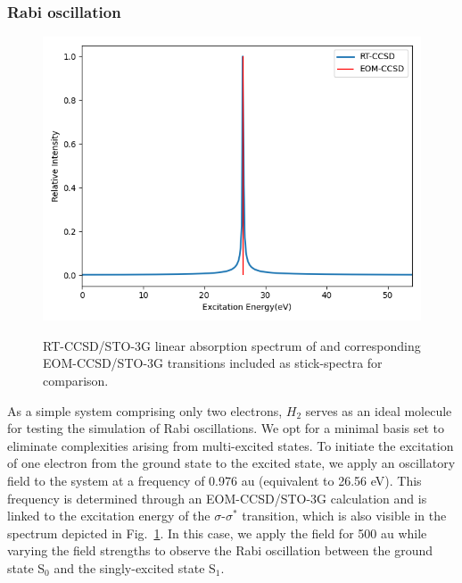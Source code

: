 \subsubsection{Rabi oscillation} \label{results-cc3-31}
 \label{results-cc3-311}
\begin{figure}
   \centering
   \includegraphics[angle=0, scale=0.45]{ch4/Figs/6-1.png}
   \label{fig:sp-monomer}
   \caption{RT-CCSD/STO-3G linear absorption spectrum of  and corresponding EOM-CCSD/STO-3G transitions included as stick-spectra for comparison.}
     \label{fig:h2-abs}
\end{figure}
As a simple system comprising only two electrons, $H_{2}$ serves as an ideal molecule for testing the simulation of Rabi oscillations. We opt for a minimal basis set to eliminate complexities arising from multi-excited states. To initiate the excitation of one electron from the ground state to the excited state, we apply an oscillatory field to the system at a frequency of 0.976 au (equivalent to 26.56 eV). This frequency is determined through an EOM-CCSD/STO-3G calculation and is linked to the excitation energy of the $\sigma$-$\sigma^{*}$ transition, which is also visible in the spectrum depicted in Fig.~\ref{fig:h2-abs}. In this case, we apply the field for 500 au while varying the field strengths to observe the Rabi oscillation between the ground state S$_{0}$ and the singly-excited state S$_{1}$.

